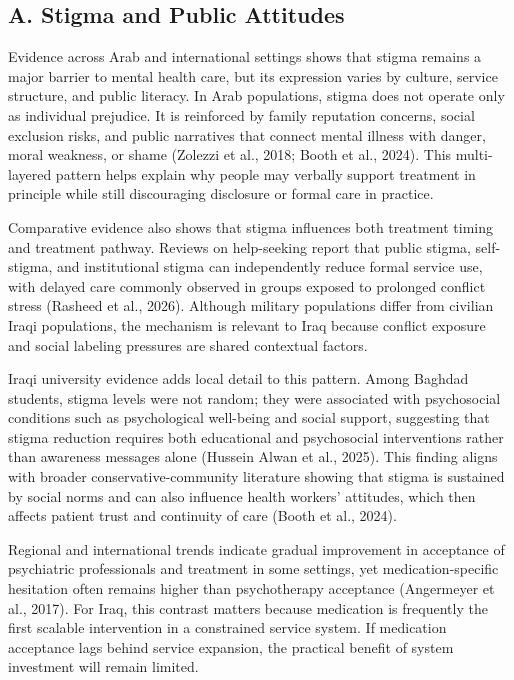 \documentclass[12pt,a4paper]{article}
\begin{document}
\subsection*{A. Stigma and Public Attitudes}
Evidence across Arab and international settings shows that stigma remains a major barrier to mental health care, but its expression varies by culture, service structure, and public literacy. In Arab populations, stigma does not operate only as individual prejudice. It is reinforced by family reputation concerns, social exclusion risks, and public narratives that connect mental illness with danger, moral weakness, or shame (Zolezzi et al., 2018; Booth et al., 2024). This multi-layered pattern helps explain why people may verbally support treatment in principle while still discouraging disclosure or formal care in practice.

Comparative evidence also shows that stigma influences both treatment timing and treatment pathway. Reviews on help-seeking report that public stigma, self-stigma, and institutional stigma can independently reduce formal service use, with delayed care commonly observed in groups exposed to prolonged conflict stress (Rasheed et al., 2026). Although military populations differ from civilian Iraqi populations, the mechanism is relevant to Iraq because conflict exposure and social labeling pressures are shared contextual factors.

Iraqi university evidence adds local detail to this pattern. Among Baghdad students, stigma levels were not random; they were associated with psychosocial conditions such as psychological well-being and social support, suggesting that stigma reduction requires both educational and psychosocial interventions rather than awareness messages alone (Hussein Alwan et al., 2025). This finding aligns with broader conservative-community literature showing that stigma is sustained by social norms and can also influence health workers’ attitudes, which then affects patient trust and continuity of care (Booth et al., 2024).

Regional and international trends indicate gradual improvement in acceptance of psychiatric professionals and treatment in some settings, yet medication-specific hesitation often remains higher than psychotherapy acceptance (Angermeyer et al., 2017). For Iraq, this contrast matters because medication is frequently the first scalable intervention in a constrained service system. If medication acceptance lags behind service expansion, the practical benefit of system investment will remain limited.
\end{document}
